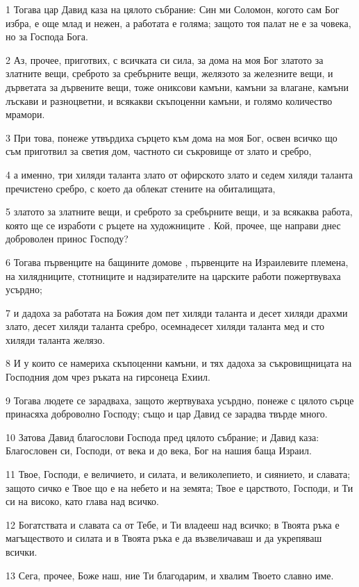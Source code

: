 \par 1 Тогава цар Давид каза на цялото събрание: Син ми Соломон, когото сам Бог избра, е още млад и нежен, а работата е голяма; защото тоя палат не е за човека, но за Господа Бога.
\par 2 Аз, прочее, приготвих, с всичката си сила, за дома на моя Бог златото за златните вещи, среброто за сребърните вещи, желязото за железните вещи, и дърветата за дървените вещи, тоже ониксови камъни, камъни за влагане, камъни лъскави и разноцветни, и всякакви скъпоценни камъни, и голямо количество мрамори.
\par 3 При това, понеже утвърдиха сърцето към дома на моя Бог, освен всичко що съм приготвил за светия дом, частното си съкровище от злато и сребро,
\par 4 а именно, три хиляди таланта злато от офирското злато и седем хиляди таланта пречистено сребро, с което да облекат стените на обиталищата,
\par 5 златото за златните вещи, и среброто за сребърните вещи, и за всякаква работа, която ще се изработи с ръцете на художниците . Кой, прочее, ще направи днес доброволен принос Господу?
\par 6 Тогава първенците на бащините домове , първенците на Израилевите племена, на хилядниците, стотниците и надзирателите на царските работи пожертвуваха усърдно;
\par 7 и дадоха за работата на Божия дом пет хиляди таланта и десет хиляди драхми злато, десет хиляди таланта сребро, осемнадесет хиляди таланта мед и сто хиляди таланта желязо.
\par 8 И у които се намериха скъпоценни камъни, и тях дадоха за съкровищницата на Господния дом чрез ръката на гирсонеца Ехиил.
\par 9 Тогава людете се зарадваха, защото жертвуваха усърдно, понеже с цялото сърце принасяха доброволно Господу; също и цар Давид се зарадва твърде много.
\par 10 Затова Давид благослови Господа пред цялото събрание; и Давид каза: Благословен си, Господи, от века и до века, Бог на нашия баща Израил.
\par 11 Твое, Господи, е величието, и силата, и великолепието, и сиянието, и славата; защото сичко е Твое що е на небето и на земята; Твое е царството, Господи, и Ти си на високо, като глава над всичко.
\par 12 Богатствата и славата са от Тебе, и Ти владееш над всичко; в Твоята ръка е магъществото и силата и в Твоята ръка е да възвеличаваш и да укрепяваш всички.
\par 13 Сега, прочее, Боже наш, ние Ти благодарим, и хвалим Твоето славно име.
